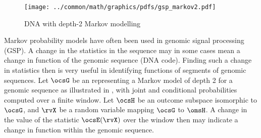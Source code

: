 \begin{tabstr}{0.75}
\begin{figure}[h]
  \gsize%
  \centering%
  \texttt{[image: ../common/math/graphics/pdfs/gsp\_markov2.pdf]}
  \caption{DNA with depth-2 Markov modelling \label{fig:gsp_markov2}}
\end{figure}
\begin{example}
\label{ex:gsp_markov2}
Markov probability models have often been used in genomic signal processing (GSP).
A change in the statistics in the sequence may in some cases mean a change in function of the genomic sequence (DNA code).
Finding such a change in statistics then is very useful in identifying functions of segments of genomic sequences.
Let $\ocsG$ be an   representing a 
Markov model of depth 2 for a genomic sequence as illustrated in ,
with joint and conditional probabilities computed over a finite window.
Let $\ocsH$ be an outcome subspace isomorphic to $\ocsG$, and 
$\rvX$ be a random variable mapping $\ocsG$ to $\omsH$.
A change in the value of the statistic $\ocsE(\rvX)$ over the window then may indicate a change in function
within the genomic sequence.
\end{example}



\end{tabstr}

